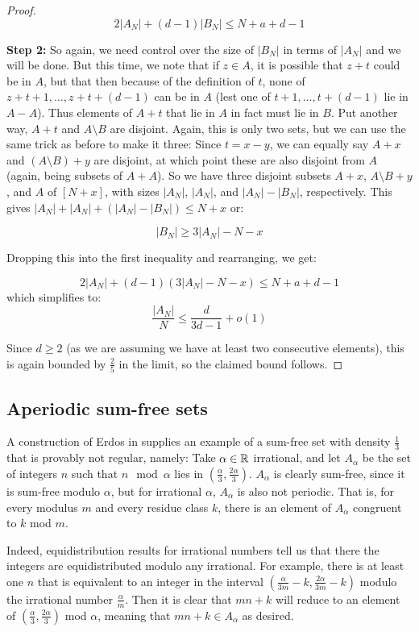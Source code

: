 \documentclass{report}
\theoremstyle{remark}
\numberwithin{equation}{section}
\begin{document}
\begin{proof}
\[2|A_N|+(d-1)|B_N| \leq N+a+d-1\]

\textbf{Step 2: }So again, we need control over the size of $|B_N|$ in
terms of $|A_N|$ and we will be done.  But this time, we note that if
$z \in A$, it is possible that $z+t$ could be in $A$, but that then
because of the definition of $t$, none of $z+t+1, \ldots, z+t+(d-1)$
can be in $A$ (lest one of $t+1, \ldots, t+(d-1)$ lie in $A-A$).  Thus
elements of $A+t$ that lie in $A$ in fact must lie in $B$.  Put another
way, $A+t$ and $A \setminus B$ are disjoint.  Again, this is only two
sets, but we can use the same trick as before to make it three: Since
$t = x-y$, we can equally say $A+x$ and $(A \setminus B) + y$ are
disjoint, at which point these are also disjoint from $A$ (again,
being subsets of $A+A$).  So we have three disjoint subsets $A+x$,
$A \setminus B + y$, and $A$ of $[N+x]$, with sizes $|A_N|$, $|A_N|$,
and $|A_N|-|B_N|$, respectively.  This gives
$|A_N| + |A_N| + (|A_N| - |B_N|) \leq N+x$ or:

\[|B_N| \geq 3|A_N|-N-x\]

Dropping this into the first inequality and rearranging, we get:

\[2|A_N|+(d-1)(3|A_N|-N-x) \leq N+a+d-1\]
which simplifies to: 
\[\frac{|A_N|}{N} \leq \frac{d}{3d-1} + o(1)\]

Since $d \geq 2$ (as we are assuming we have at least two consecutive
elements), this is again bounded by $\frac25$ in the limit, so the
claimed bound follows.
\end{proof}

\subsection{Aperiodic sum-free sets}

A construction of Erdos in \cite{erdos:spm1965} supplies an example of
a sum-free set with density $\frac13$ that is provably not regular,
namely: Take $\alpha \in \mathbb{R}$ irrational, and let $A_\alpha$ be the set
of integers $n$ such that $n \mod{\alpha}$ lies in
$\left(\frac \alpha 3, \frac {2\alpha}{3}\right)$.  $A_\alpha$ is
clearly sum-free, since it is sum-free modulo $\alpha$, but for
irrational $\alpha$, $A_\alpha$ is also not periodic.  That is, for
every modulus $m$ and every residue class $k$, there is an element of
$A_\alpha$ congruent to $k$ mod $m$.

Indeed, equidistribution results for irrational numbers tell us that
there the integers are equidistributed modulo any irrational.  For
example, there is at least one $n$ that is equivalent to an integer in
the interval $\left(\frac{\alpha}{3m}-k,\frac{2\alpha}{3m}-k\right)$
modulo the irrational number $\frac{\alpha}{m}$.  Then it is clear
that $mn+k$ will reduce to an element of
$\left(\frac{\alpha}{3},\frac{2\alpha}{3}\right)$ mod $\alpha$,
meaning that $mn+k \in A_\alpha$ as desired.
\end{document}
